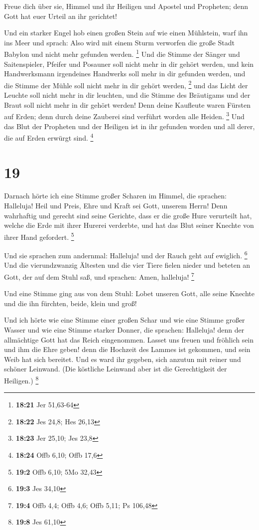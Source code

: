  Freue dich über sie, Himmel und ihr Heiligen und Apostel
und Propheten; denn Gott hat euer Urteil an ihr gerichtet!

 Und ein starker Engel hob einen großen Stein auf wie einen
Mühlstein, warf ihn ins Meer und sprach: Also wird mit einem Sturm
verworfen die große Stadt Babylon und nicht mehr gefunden werden.
\footnote{\textbf{18:21} Jer 51,63-64}  Und die Stimme der
Sänger und Saitenspieler, Pfeifer und Posauner soll nicht mehr in dir
gehört werden, und kein Handwerksmann irgendeines Handwerks soll mehr in
dir gefunden werden, und die Stimme der Mühle soll nicht mehr in dir
gehört werden, \footnote{\textbf{18:22} Jes 24,8; Hes 26,13}
 und das Licht der Leuchte soll nicht mehr in dir leuchten,
und die Stimme des Bräutigams und der Braut soll nicht mehr in dir
gehört werden! Denn deine Kaufleute waren Fürsten auf Erden; denn durch
deine Zauberei sind verführt worden alle Heiden. \footnote{\textbf{18:23}
  Jer 25,10; Jes 23,8}  Und das Blut der Propheten und der
Heiligen ist in ihr gefunden worden und all derer, die auf Erden erwürgt
sind. \footnote{\textbf{18:24} Offb 6,10; Offb 17,6}

\hypertarget{section-8}{%
\section{19}\label{section-8}}

 Darnach hörte ich eine Stimme großer Scharen im Himmel, die
sprachen: Halleluja! Heil und Preis, Ehre und Kraft sei Gott, unserem
Herrn!  Denn wahrhaftig und gerecht sind seine Gerichte,
dass er die große Hure verurteilt hat, welche die Erde mit ihrer Hurerei
verderbte, und hat das Blut seiner Knechte von ihrer Hand gefordert.
\footnote{\textbf{19:2} Offb 6,10; 5Mo 32,43}

 Und sie sprachen zum andernmal: Halleluja! und der Rauch
geht auf ewiglich. \footnote{\textbf{19:3} Jes 34,10}  Und
die vierundzwanzig Ältesten und die vier Tiere fielen nieder und beteten
an Gott, der auf dem Stuhl saß, und sprachen: Amen, halleluja!
\footnote{\textbf{19:4} Offb 4,4; Offb 4,6; Offb 5,11; Ps 106,48}

 Und eine Stimme ging aus von dem Stuhl: Lobet unseren Gott,
alle seine Knechte und die ihn fürchten, beide, klein und groß!

 Und ich hörte wie eine Stimme einer großen Schar und wie
eine Stimme großer Wasser und wie eine Stimme starker Donner, die
sprachen: Halleluja! denn der allmächtige Gott hat das Reich
eingenommen.  Lasset uns freuen und fröhlich sein und ihm
die Ehre geben! denn die Hochzeit des Lammes ist gekommen, und sein Weib
hat sich bereitet.  Und es ward ihr gegeben, sich anzutun
mit reiner und schöner Leinwand. (Die köstliche Leinwand aber ist die
Gerechtigkeit der Heiligen.) \footnote{\textbf{19:8} Jes 61,10}

